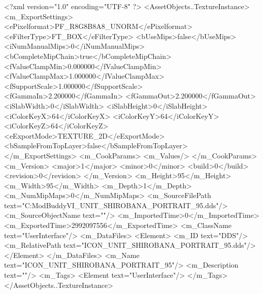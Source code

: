 <?xml version="1.0" encoding="UTF-8" ?>
<AssetObjects..TextureInstance>
	<m_ExportSettings>
		<ePixelformat>PF_R8G8B8A8_UNORM</ePixelformat>
		<eFilterType>FT_BOX</eFilterType>
		<bUseMips>false</bUseMips>
		<iNumManualMips>0</iNumManualMips>
		<bCompleteMipChain>true</bCompleteMipChain>
		<fValueClampMin>0.000000</fValueClampMin>
		<fValueClampMax>1.000000</fValueClampMax>
		<fSupportScale>1.000000</fSupportScale>
		<fGammaIn>2.200000</fGammaIn>
		<fGammaOut>2.200000</fGammaOut>
		<iSlabWidth>0</iSlabWidth>
		<iSlabHeight>0</iSlabHeight>
		<iColorKeyX>64</iColorKeyX>
		<iColorKeyY>64</iColorKeyY>
		<iColorKeyZ>64</iColorKeyZ>
		<eExportMode>TEXTURE_2D</eExportMode>
		<bSampleFromTopLayer>false</bSampleFromTopLayer>
	</m_ExportSettings>
	<m_CookParams>
		<m_Values/>
	</m_CookParams>
	<m_Version>
		<major>1</major>
		<minor>0</minor>
		<build>0</build>
		<revision>0</revision>
	</m_Version>
	<m_Height>95</m_Height>
	<m_Width>95</m_Width>
	<m_Depth>1</m_Depth>
	<m_NumMipMaps>0</m_NumMipMaps>
	<m_SourceFilePath text="C:\Users\asus\Documents\Firaxis ModBuddy\Civilization VI\temppic\ICON_UNIT_SHIROBANA_PORTRAIT_95.dds"/>
	<m_SourceObjectName text=""/>
	<m_ImportedTime>0</m_ImportedTime>
	<m_ExportedTime>2992097556</m_ExportedTime>
	<m_ClassName text="UserInterface"/>
	<m_DataFiles>
		<Element>
			<m_ID text="DDS"/>
			<m_RelativePath text="ICON_UNIT_SHIROBANA_PORTRAIT_95.dds"/>
		</Element>
	</m_DataFiles>
	<m_Name text="ICON_UNIT_SHIROBANA_PORTRAIT_95"/>
	<m_Description text=""/>
	<m_Tags>
		<Element text="UserInterface"/>
	</m_Tags>
</AssetObjects..TextureInstance>


